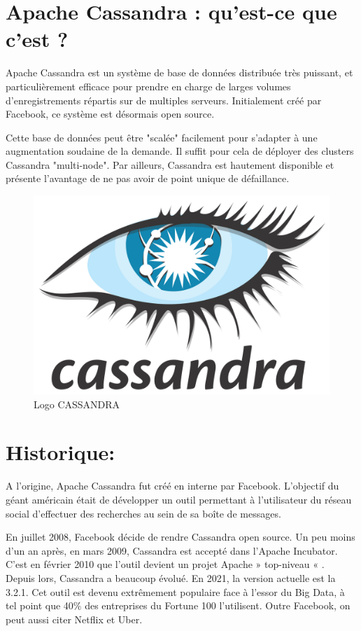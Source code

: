 \section{Apache Cassandra : qu’est-ce que c’est ?}
Apache Cassandra est un système de base de données distribuée très puissant, et particulièrement efficace pour prendre en charge de larges volumes d’enregistrements répartis sur de multiples serveurs. Initialement créé par Facebook, ce système est désormais open source.

Cette base de données peut être "scalée" facilement pour s’adapter à une augmentation soudaine de la demande. Il suffit pour cela de déployer des clusters Cassandra "multi-node". Par ailleurs, Cassandra est hautement disponible et présente l’avantage de ne pas avoir de point unique de défaillance.

\begin{figure}[h]
	\centering
    \includegraphics[scale=0.1]{img/part1/4.10}
    \caption{Logo CASSANDRA}
\end{figure}

\section{Historique:}
A l’origine, Apache Cassandra fut créé en interne par Facebook. L’objectif du géant américain était de développer un outil permettant à l’utilisateur du réseau social d’effectuer des recherches au sein de sa boîte de messages.

En juillet 2008, Facebook décide de rendre Cassandra open source. Un peu moins d’un an après, en mars 2009, Cassandra est accepté dans l’Apache Incubator. C’est en février 2010 que l’outil devient un projet Apache  » top-niveau « .
\\Depuis lors, Cassandra a beaucoup évolué. En 2021, la version actuelle est la 3.2.1. Cet outil est devenu extrêmement populaire face à l’essor du Big Data, à tel point que 40\% des entreprises du Fortune 100 l’utilisent. Outre Facebook, on peut aussi citer Netflix et Uber.